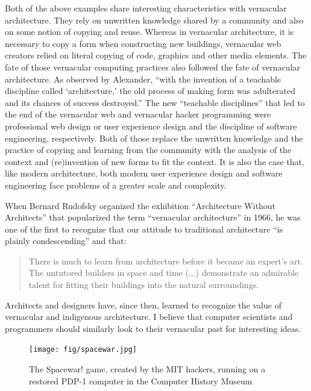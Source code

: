 Both of the above examples share interesting characteristics with vernacular architecture.
They rely on unwritten knowledge shared by a community and also on some notion of copying
and reuse. Whereas in vernacular architecture, it is necessary to copy a form when constructing
new buildings, vernacular web creators relied on literal copying of code, graphics and other
media elements. The fate of those vernacular computing practices also followed the fate of
vernacular architecture. As observed by Alexander, ``with the invention of a teachable discipline
called `architecture,'  the old process of making form was adulterated and its chances of success
destroyed.'' The new ``teachable disciplines'' that led to the end of the
vernacular web and vernacular hacker programming were professional web design or user experience
design and the discipline of software engineering, respectively. Both of those replace the
unwritten knowledge and the practice of copying and learning from the community with the
analysis of the context and (re)invention of new forms to fit the context. It is also the case that,
like modern architecture, both modern user experience design and software engineering face problems
of a greater scale and complexity.

When Bernard Rudofsky organized the exhibition ``Architecture Without Architects'' that popularized
the term ``vernacular architecture'' in 1966, he was one of the first to recognize that our
attitude to traditional architecture ``is plainly condescending'' and that:

\begin{quote}
There is much to learn from architecture before it became an expert's art. The
untutored builders in space and time (...) demonstrate an admirable talent for
fitting their buildings into the natural surroundings.
\end{quote}

Architects and designers have, since then, learned to recognize the value of vernacular and
indigenous architecture. I believe that computer scientists and
programmers should similarly look to their vernacular past for interesting ideas.

\begin{figure}
  \centering
  \texttt{[image: fig/spacewar.jpg]}
  \caption{The Spacewar! game, created by the MIT hackers, running on a restored PDP-1 computer
  in the Computer History Museum}
  \label{fig:spacewar}
\end{figure}

